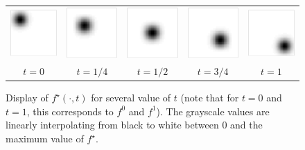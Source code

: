 \begin{figure}[!ht]
\begin{center}
\begin{tabular}{ccccc}
\includegraphics[width=2.5cm]{images/bump_betaold/bump_beta1_01}&
\includegraphics[width=2.5cm]{images/bump_betaold/bump_beta1_09}&
\includegraphics[width=2.5cm]{images/bump_betaold/bump_beta1_17}&
\includegraphics[width=2.5cm]{images/bump_betaold/bump_beta1_25}&
\includegraphics[width=2.5cm]{images/bump_betaold/bump_beta1_33}\\
$t=0$&$t=1/4$&$t=1/2$&$t=3/4$&$t=1$ %
\end{tabular}
\caption{\label{fig:data_bump} 
Display of $f^\star(\cdot,t)$ for several value of $t$ (note that for $t=0$ and $t=1$, this corresponds to $f^0$ and $f^1$). The grayscale values are linearly interpolating from black to white between 0 and the maximum value of $f^\star$. 
}
\end{center}
\end{figure}

